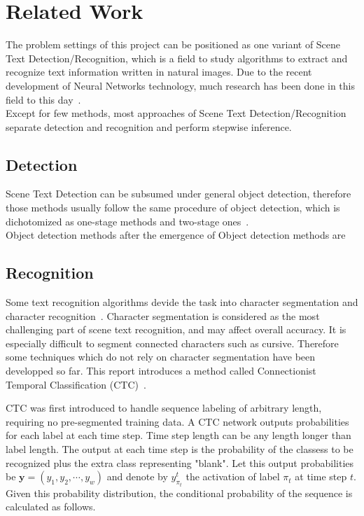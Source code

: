 \section{Related Work}

The problem settings of this project can be positioned as one variant of Scene Text Detection/Recognition, which
is a field to study algorithms to extract and recognize text information written in natural images.
Due to the recent development of Neural Networks technology,
much research has been done in this field to this day~\cite{long2018scene}.\\
Except for few methods\cite{liu2018fots}\cite{lyu2018mask}, most approaches of Scene Text Detection/Recognition
separate detection and recognition and perform stepwise inference.

\subsection{Detection}

Scene Text Detection can be subsumed under general object detection, therefore those methods usually follow
the same procedure of object detection, which is dichotomized as one-stage methods and two-stage ones~\cite{liu2018deep}.\\

Object detection methods after the emergence of Object detection methods are

\subsection{Recognition}

Some text recognition algorithms devide the task into character segmentation and character recognition~\cite{bissacco2013photoocr}\cite{phan2011gradient}.
Character segmentation is considered as the most challenging part of scene text recognition, and may affect
overall accuracy. It is especially difficult to segment connected characters such as cursive.
Therefore some techniques which do not rely on character segmentation have been developped so far.
This report introduces a method called Connectionist Temporal Classification (CTC)~\cite{graves2006connectionist}.

CTC was first introduced to handle sequence labeling of arbitrary length,
requiring no pre-segmented training data. A CTC network outputs probabilities for each label
at each time step. Time step length can be any length longer than label length.
The output at each time step is the probability of the classess to be recognized plus
the extra class representing "blank". Let this output probabilities be
$\mathbf{y}=(y_1, y_2, \cdots, y_w)$ and denote by $y_{\pi_t}^{t}$ the activation of
label $\pi_t$ at time step $t$. Given this probability distribution, the conditional
probability of the sequence is calculated as follows.

